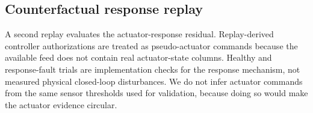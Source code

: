 \documentclass[preprint,12pt,doubleblind]{elsarticle}
\begin{document}
\begin{table}[!htbp]
\centering
\caption{Compact synthetic fault-injection protocol for the current hydroponic replay benchmark. The repository also defines a larger shardable stress-test profile, but those full-factorial results are not used as manuscript evidence.}
\label{tab:fault_protocol}
\footnotesize
{}
\end{table}

\subsection{Counterfactual response replay}
A second replay evaluates the actuator-response residual. Replay-derived controller authorizations are treated as pseudo-actuator commands because the available feed does not contain real actuator-state columns. Healthy and response-fault trials are implementation checks for the response mechanism, not measured physical closed-loop disturbances. We do not infer actuator commands from the same sensor thresholds used for validation, because doing so would make the actuator evidence circular.
\end{document}
